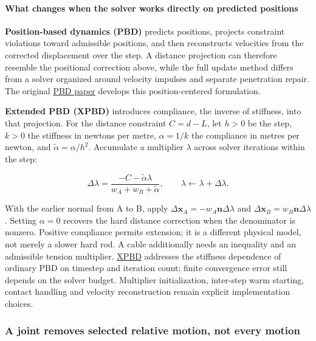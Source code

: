 \paragraph{What changes when the solver works directly on predicted positions}\label{06-engine-ii-ch033-what-changes-when-the-solver-works-directly-on-predicted-positions}

\textbf{Position-based dynamics (PBD)} predicts positions, projects constraint violations toward admissible positions, and then reconstructs velocities from the corrected displacement over the step. A distance projection can therefore resemble the positional correction above, while the full update method differs from a solver organized around velocity impulses and separate penetration repair. The original \href{https://doi.org/10.2312/PE/vriphys/vriphys06/071-080}{PBD paper} develops this position-centered formulation.

\textbf{Extended PBD (XPBD)} introduces compliance, the inverse of stiffness, into that projection. For the distance constraint \(C=d-L\), let \(h>0\) be the step, \(k>0\) the stiffness in newtons per metre, \(\alpha=1/k\) the compliance in metres per newton, and \(\widetilde\alpha=\alpha/h^2\). Accumulate a multiplier \(\lambda\) across solver iterations within the step:

\[
\Delta\lambda=\frac{-C-\widetilde\alpha\lambda}{w_A+w_B+\widetilde\alpha},\qquad
\lambda\leftarrow\lambda+\Delta\lambda.
\]

With the earlier normal from A to B, apply \(\Delta\mathbf x_A=-w_A\mathbf n\Delta\lambda\) and \(\Delta\mathbf x_B=w_B\mathbf n\Delta\lambda\). Setting \(\alpha=0\) recovers the hard distance correction when the denominator is nonzero. Positive compliance permits extension; it is a different physical model, not merely a slower hard rod. A cable additionally needs an inequality and an admissible tension multiplier. \href{https://mmacklin.com/xpbd.pdf}{XPBD} addresses the stiffness dependence of ordinary PBD on timestep and iteration count; finite convergence error still depends on the solver budget. Multiplier initialization, inter-step warm starting, contact handling and velocity reconstruction remain explicit implementation choices.

\subsubsection{A joint removes selected relative motion, not every motion}\label{06-engine-ii-ch033-a-joint-removes-selected-relative-motion-not-every-motion}

